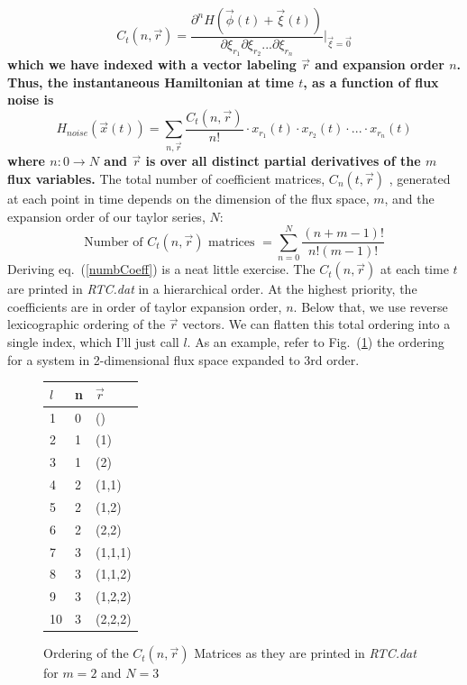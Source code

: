 \documentclass[12pt]{article}
\begin{document}
\newline
\begin{equation}
\boxed{C_t(n,\vec{r}) = \frac{\partial^n H(\vec{\phi}(t)+ \vec{\xi}(t))} {\partial \xi_{r_1}\partial \xi_{r_2}...\partial \xi_{r_n}}  |_{\vec{\xi}=\vec{0}}}
\end{equation}
\newline
\textbf{which we have indexed with a vector labeling $\vec{r}$ and expansion order $n$. Thus, the instantaneous Hamiltonian at time $t$, as a function of flux noise is}
\newline
\begin{equation}
\boxed{H_{noise}(\vec{x}(t)) = \sum_{n,\vec{r}} \frac{C_t(n,\vec{r})}{n!} \cdot x_{r_1}(t) \cdot x_{r_2}(t) \cdot ... \cdot x_{r_n}(t)} 
\end{equation}
\newline
\textbf{where $n: 0 \rightarrow N$ and $\vec{r}$ is over all distinct partial derivatives of the $m$ flux variables.}
\newline
\newline
The total number of coefficient matrices, $C_n(t,\vec{r})$ , generated at each point in time depends on the dimension of the flux space, $m$, and the expansion order of our taylor series, $N$:
\begin{equation}
\mbox{Number of } C_t(n,\vec{r}) \mbox{ matrices } =\sum_{n=0}^N \frac{(n+m-1)!}{n!(m-1)!}
\label{numbCoeff}
\end{equation}
Deriving eq.~(\ref{numbCoeff}) is a neat little exercise.
\newline
\newline
The $C_t(n,\vec{r})$ at each time $t$ are printed in \textit{RTC.dat} in a hierarchical order. At the highest priority, the coefficients are in order of taylor expansion order, $n$. Below that, we use reverse lexicographic ordering of the $\vec{r}$ vectors. We can flatten this total ordering into a single index, which I'll just call $l.$ As an example, refer to Fig.~(\ref{coeffOrdering}) the ordering for a system in 2-dimensional flux space expanded to 3rd order.
\begin{figure}[h!]
\begin{center}
    \begin{tabular}{ l l l }
 	$l$ & n & $\vec{r}$ \\ \hline
 	1 & 0 & () \\
 	2 & 1 & (1) \\
 	3 & 1 & (2) \\
 	4 & 2 & (1,1) \\
 	5 & 2 & (1,2) \\
 	6 & 2 & (2,2) \\
 	7 & 3 & (1,1,1) \\
 	8 & 3 & (1,1,2) \\
 	9 & 3 & (1,2,2) \\
 	10 & 3 & (2,2,2)
    \end{tabular}
\end{center}
\caption{Ordering of the $C_t(n,\vec{r})$ Matrices as they are printed in \textit{RTC.dat} for $m=2$ and $N=3$}
\label{coeffOrdering}
\end{figure}
\end{document}
